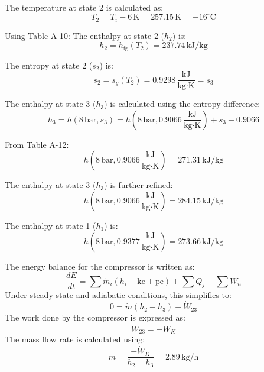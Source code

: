 The temperature at state 2 is calculated as:  
\[
T_2 = T_i - 6 \, \text{K} = 257.15 \, \text{K} = -16^\circ\text{C}
\]

Using Table A-10:  
The enthalpy at state 2 (\(h_2\)) is:  
\[
h_2 = h_{\text{fg}}(T_2) = 237.74 \, \text{kJ/kg}
\]

The entropy at state 2 (\(s_2\)) is:  
\[
s_2 = s_g(T_2) = 0.9298 \, \frac{\text{kJ}}{\text{kg·K}} = s_3
\]

The enthalpy at state 3 (\(h_3\)) is calculated using the entropy difference:  
\[
h_3 = h(8 \, \text{bar}, s_3) = h(8 \, \text{bar}, 0.9066 \, \frac{\text{kJ}}{\text{kg·K}}) + s_3 - 0.9066
\]

From Table A-12:  
\[
h(8 \, \text{bar}, 0.9066 \, \frac{\text{kJ}}{\text{kg·K}}) = 271.31 \, \text{kJ/kg}
\]

The enthalpy at state 3 (\(h_3\)) is further refined:  
\[
h(8 \, \text{bar}, 0.9066 \, \frac{\text{kJ}}{\text{kg·K}}) = 284.15 \, \text{kJ/kg}
\]

The enthalpy at state 1 (\(h_1\)) is:  
\[
h(8 \, \text{bar}, 0.9377 \, \frac{\text{kJ}}{\text{kg·K}}) = 273.66 \, \text{kJ/kg}
\]

The energy balance for the compressor is written as:  
\[
\frac{dE}{dt} = \sum \dot{m}_i \left( h_i + \text{ke} + \text{pe} \right) + \sum \dot{Q}_j - \sum \dot{W}_n
\]  
Under steady-state and adiabatic conditions, this simplifies to:  
\[
0 = \dot{m} \left( h_2 - h_3 \right) - \dot{W}_{23}
\]  
The work done by the compressor is expressed as:  
\[
\dot{W}_{23} = -\dot{W}_K
\]  
The mass flow rate is calculated using:  
\[
\dot{m} = \frac{-\dot{W}_K}{h_2 - h_3} = 2.89 \, \text{kg/h}
\]